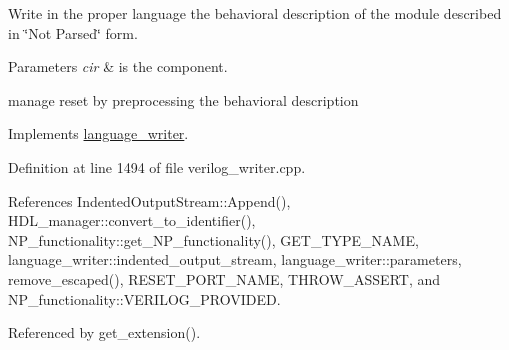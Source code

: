 Write in the proper language the behavioral description of the module described in \char`\"{}\+Not Parsed\char`\"{} form. 


\begin{DoxyParams}{Parameters}
{\em cir} & is the component. \\
\hline
\end{DoxyParams}
manage reset by preprocessing the behavioral description 

Implements \hyperlink{classlanguage__writer_a75a800dc2e7afbecf76f1acaae82b6ce}{language\+\_\+writer}.



Definition at line 1494 of file verilog\+\_\+writer.\+cpp.



References Indented\+Output\+Stream\+::\+Append(), H\+D\+L\+\_\+manager\+::convert\+\_\+to\+\_\+identifier(), N\+P\+\_\+functionality\+::get\+\_\+\+N\+P\+\_\+functionality(), G\+E\+T\+\_\+\+T\+Y\+P\+E\+\_\+\+N\+A\+ME, language\+\_\+writer\+::indented\+\_\+output\+\_\+stream, language\+\_\+writer\+::parameters, remove\+\_\+escaped(), R\+E\+S\+E\+T\+\_\+\+P\+O\+R\+T\+\_\+\+N\+A\+ME, T\+H\+R\+O\+W\+\_\+\+A\+S\+S\+E\+RT, and N\+P\+\_\+functionality\+::\+V\+E\+R\+I\+L\+O\+G\+\_\+\+P\+R\+O\+V\+I\+D\+ED.



Referenced by get\+\_\+extension().


